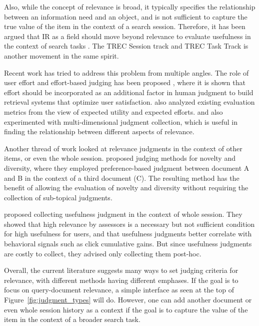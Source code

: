 Also, while the concept of relevance is broad, it typically specifies the relationship between an information need and an object, and is not sufficient to capture the true value of the item in the context of a search session. Therefore, it has been argued that IR as a field should move beyond relevance to evaluate usefulness in the context of search tasks \citep{Belkin:2015:SAL}. The TREC Session track \citep{carterette2014overview} and TREC Task Track \cite{yilmaz2015overview} is another movement in the same spirit.



Recent work has tried to address this problem from multiple angles. The role of user effort and effort-based judging has been proposed \citep{Yilmaz:2014,VermaYC16}, where it is shown that effort should be incorporated as an additional factor in human judgment to build retrieval systems that optimize user satisfaction. \cite{Carterette:2011:SEU} also analyzed existing evaluation metrics from the view of expected utility and expected efforts. \cite{Golbus:2014:CDR} and \cite{Kim:2013} also experimented with multi-dimensional judgment collection, which is useful in finding the relationship between different aspects of relevance. 

Another thread of work looked at relevance judgments in the context of other items, or even the whole session. \cite{Chandar2013} proposed judging methods for novelty and diversity, where they employed preference-based judgment between document A and B in the context of a third document (C). The resulting method has the benefit of allowing the evaluation of novelty and diversity without requiring the collection of sub-topical judgments. 

\cite{Mao:2016} proposed collecting usefulness judgment in the context of whole session. They showed that high relevance by assessors is a necessary but not sufficient condition for high usefulness for users, and that usefulness judgments better correlate with behavioral signals such as click cumulative gains. But since usefulness judgments are costly to collect, they advised only collecting them post-hoc.

Overall, the current literature suggests many ways to set judging criteria for relevance, with different methods having different emphases. If the goal is to focus on query-document relevance, a simple interface as seen at the top of Figure~\ref{fig:judgment_types} will do. However, one can add another document or even whole session history as a context if the goal is to capture the value of the item in the context of a broader search task. 


